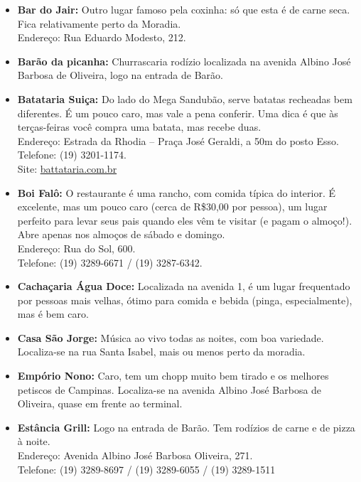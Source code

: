 \begin{itemize}
\item   \textbf{Bar do Jair:} Outro lugar famoso pela coxinha: só que esta é de
        carne seca. Fica relativamente perto da Moradia.
        \\Endereço: Rua Eduardo Modesto, 212.

\item   \textbf{Barão da picanha:} Churrascaria rodízio localizada na avenida
        Albino José Barbosa de Oliveira, logo na entrada de Barão.

\item   \textbf{Batataria Suiça:} Do lado do Mega Sandubão, serve batatas
        recheadas bem diferentes. É um pouco caro, mas vale a pena conferir. Uma
        dica é que às terças-feiras você compra uma batata, mas recebe duas.
        \\Endereço: Estrada da Rhodia -- Praça José Geraldi, a 50m do posto Esso.
        \\Telefone: (19) 3201-1174.
        \\Site: \url{battataria.com.br}

\item   \textbf{Boi Falô:} O restaurante é uma rancho, com comida típica do
        interior. É excelente, mas um pouco caro (cerca de R\$30,00 por pessoa),
        um lugar perfeito para levar seus pais quando eles vêm te visitar (e
        pagam o almoço!). Abre apenas nos almoços de sábado e domingo.
        \\Endereço: Rua do Sol, 600.
        \\Telefone: (19) 3289-6671 / (19) 3287-6342.

\item   \textbf{Cachaçaria Água Doce:} Localizada na avenida 1, é um lugar
        frequentado por pessoas mais velhas, ótimo para comida e bebida (pinga,
        especialmente), mas é bem caro.

\item   \textbf{Casa São Jorge:} Música ao vivo todas as noites, com boa
        variedade. Localiza-se na rua Santa Isabel, mais ou menos perto da
        moradia.

\item   \textbf{Empório Nono:} Caro, tem um chopp muito bem tirado e os melhores
        petiscos de Campinas. Localiza-se na avenida Albino José Barbosa de
        Oliveira, quase em frente ao terminal.

\item   \textbf{Estância Grill:} Logo na entrada de Barão. Tem rodízios de
        carne e de pizza à noite.
        \\Endereço: Avenida Albino José Barbosa Oliveira, 271.
        \\Telefone: (19) 3289-8697 / (19) 3289-6055 / (19) 3289-1511


\end{itemize}
